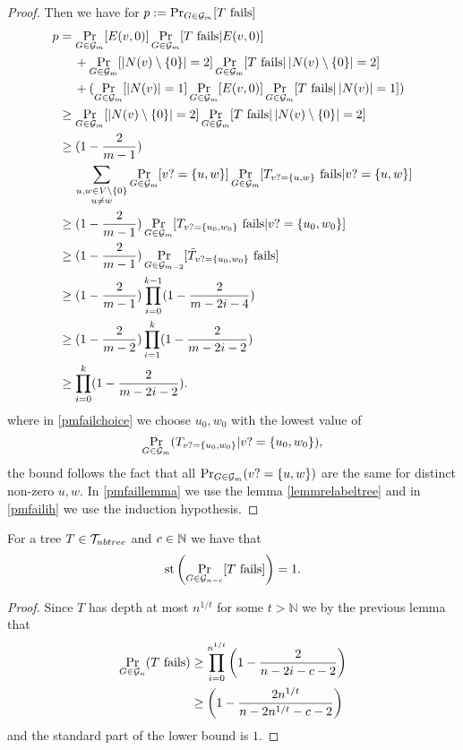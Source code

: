 \begin{proof}
Then we have for $p:=\Pr_{G\in\mathcal{G}_m}[\text{$T$ fails}]$
\begin{align}
p&=\Pr_{G\in\mathcal{G}_m}[E(v,0)]\Pr_{G\in\mathcal{G}_m}[\text{$T$ fails}|E(v,0)]\\
&\:\phantom{=}\:+\Pr_{G\in\mathcal{G}_m}[\left|{N(v)\setminus\{0\}}\right|=2]\Pr_{G\in\mathcal{G}_m}[\text{$T$ fails}|\left|{N(v)\setminus\{0\}}\right|=2]\\
&\:\phantom{=}\:+(\Pr_{G\in\mathcal{G}_m}[\left|{N(v)}\right|=1]\Pr_{G\in\mathcal{G}_m}[E(v,0)]\Pr_{G\in\mathcal{G}_m}[\text{$T$ fails}|\left|{N(v)}\right|=1])\\
&\geq \Pr_{G\in\mathcal{G}_m}[\left|{N(v)\setminus\{0\}}\right|=2]\Pr_{G\in\mathcal{G}_m}[\text{$T$ fails}|\left|{N(v)\setminus\{0\}}\right|=2]\\
&\geq (1-\frac{2}{m-1})\\
&\:\phantom{=}\:\sum_{\substack{u,w\in V\setminus \{0\} \\ u\not= w}}\Pr_{G\in\mathcal{G}_m}[v?=\{u,w\}]\Pr_{G\in\mathcal{G}_m}[T_{v?=\{u,w\}}\text{ fails}|v?=\{u,w\}]\\
&\geq(1-\frac{2}{m-1})\Pr_{G\in\mathcal{G}_m}[T_{v?=\{u_0,w_0\}}\text{ fails}|v?=\{u_0,w_0\}]\label{pmfailchoice}\\
&\geq(1-\frac{2}{m-1})\Pr_{G\in\mathcal{G}_{m-2}}[\tilde T_{v?=\{u_0,w_0\}}\text{ fails}]\label{pmfaillemma}\\
&\geq(1-\frac{2}{m-1})\prod_{i=0}^{k-1}(1-\frac{2}{m-2i-4})\label{pmfailih}\\
&\geq(1-\frac{2}{m-2})\prod_{i=1}^{k}(1-\frac{2}{m-2i-2})\\
&\geq\prod_{i=0}^{k}(1-\frac{2}{m-2i-2}).
\end{align}
where in \eqref{pmfailchoice} we choose $u_0,w_0$ with the lowest value of \[\Pr_{G\in\mathcal{G}_m}(\text{$T_{v?=\{u_0,w_0\}}|v?=\{u_0,w_0\}$}),\] the bound follows the fact that all $\Pr_{G\in\mathcal{G}_m}(v?=\{u,w\})$ are the same for distinct non-zero $u,w$. In \eqref{pmfaillemma} we use the lemma \ref{lemmrelabeltree} and in \eqref{pmfailih} we use the induction hypothesis.
\end{proof}

\begin{crll}\label{crllpPathtreefail}
For a tree $T\in \mathcal{T}_{nbtree}$ and $c\in \mathbb{N}$ we have that
\[\text{st}\left(\Pr_{G\in\mathcal{G}_{n-c}}[T\text{ fails}]\right)= 1.\]
\end{crll}
\begin{proof}
Since $T$ has depth at most $n^{1/t}$ for some $t>\mathbb{N}$ we by the previous lemma that
\begin{align}
\Pr_{G\in\mathcal{G}_n}(\text{$T$ fails})&\geq \prod_{i=0}^{n^{1/t}}\left(1-\frac{2}{n-2i-c-2}\right)\\
&\geq \left(1-\frac{2n^{1/t}}{n-2n^{1/t}-c-2}\right)
\end{align}
and the standard part of the lower bound is $1$.
\end{proof}

